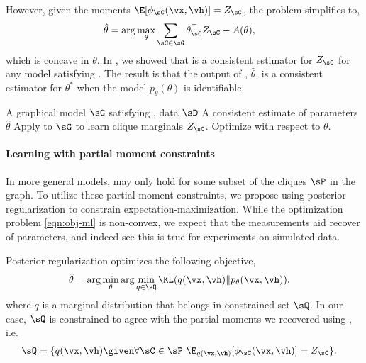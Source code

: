 However, given the moments $\E[ \phi_\sC(\vx,\vh) ] = Z_\sC$, the
  problem simplifies to,
\begin{align}
  \hat \theta 
  &= \arg\max_{\theta} \sum_{\sC \in \sG} \theta_\sC^\top Z_\sC - A(\theta), \label{eqn:obj}
\end{align}
which is concave in $\theta$.
In , we showed that \LearnMarginals is a consistent
  estimator for $Z_\sC$ for any model satisfying . 
The result is that the output of , $\hat\theta$, is a consistent estimator for $\theta^*$
  when the model $p_\theta(\theta)$ is identifiable.

\renewcommand{\algorithmicrequire}{\textbf{Input:}}
\renewcommand{\algorithmicensure}{\textbf{Output:}}
\begin{algorithm}
  \caption{\LearnLogLinear}
  \label{algo:undirected}
  \begin{algorithmic}
    \REQUIRE A graphical model $\sG$ satisfying , data $\sD$
    \ENSURE A consistent estimate of parameters $\hat \theta$
      \STATE Apply \LearnMarginals to $\sG$ to learn clique marginals $Z_\sC$.
      \STATE Optimize  with respect to $\theta$.
  \end{algorithmic}
\end{algorithm}

\paragraph{Learning with partial moment constraints}

In more general models,  may only hold for
  some subset of the cliques $\sP$ in the graph.
To utilize these partial moment constraints, we propose using posterior
  regularization \citep{graca08em} to constrain expectation-maximization.
While the optimization problem \eqref{eqn:obj-ml} is non-convex, we
  expect that the measurements aid recover of parameters, and indeed see
  this is true for experiments on simulated data.

Posterior regularization optimizes the following objective,
\begin{align*}
  \hat \theta &= \arg\min_{\theta} \arg\min_{q \in \sQ} \KL( q(\vx,\vh) \| p_{\theta}(\vx, \vh) ),
\end{align*}
where $q$ is a marginal distribution that belongs in constrained set
$\sQ$. In our case, $\sQ$ is constrained to agree with the partial
moments we recovered using \LearnMarginals, i.e. 
\begin{align*}
  \sQ &= \{ q(\vx,\vh) \given \forall \sC \in \sP ~ \E_{q(\vx,\vh)}[\phi_\sC(\vx, \vh)] = Z_\sC \}.
\end{align*}

